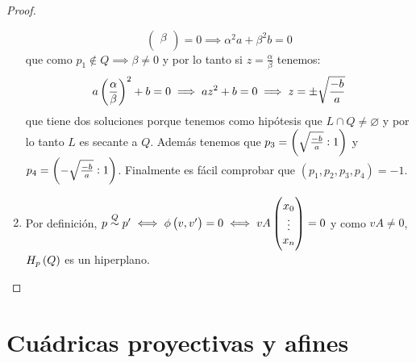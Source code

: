 \begin{proof}
\begin{enumerate}[(1)]
\[\begin{pmatrix}
     \beta\\
    \end{pmatrix}=0 \implies \alpha^2 a+\beta^2 b=0 
   \]
   que como $p_1\not\in Q \implies \beta\neq 0$ y por lo tanto si $z=\frac{\alpha}{\beta}$ tenemos:
   \[
    a\left(\frac{\alpha}{\beta}\right)^2 +b =0 \implies az^2 +b=0 \implies z=\pm \sqrt{\frac{-b}{a}}
   \]
   que tiene dos soluciones porque tenemos como hipótesis que $L\cap Q\neq\varnothing$ y por lo tanto
   $L$ es secante a $Q$. Además tenemos que $p_3=\left(\sqrt{\frac{-b}{a}}:1\right)$ y $p_4=\left(-\sqrt{\frac{-b}{a}}:1\right)$.
   Finalmente es fácil comprobar que $(p_1,p_2,p_3,p_4)=-1$.
   \item Por definición, $p \stackrel{Q}{\sim} p' \iff \phi\left( v,v'\right)=0 \iff vA\begin{pmatrix}x_0\\ \vdots\\ x_n\\ \end{pmatrix}=0$
   y como $vA\neq 0$, $H_p\left( Q\right)$ es un hiperplano.
  \end{enumerate}
\end{proof}















\section{Cuádricas proyectivas y afines}

